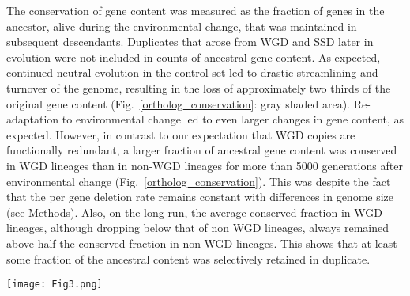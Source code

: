 The conservation of gene content was measured as the fraction of genes in the ancestor, alive during the environmental change, that was maintained in subsequent descendants. Duplicates that arose from  WGD and SSD later in evolution were not included in counts of ancestral gene content. As expected, continued neutral evolution in the control set led to drastic streamlining and turnover of the genome, resulting in the loss of approximately two thirds of the original gene content (Fig.~\ref{ortholog_conservation}: gray shaded area). Re-adaptation to environmental change led to even larger changes in gene content, as expected. However, in contrast to our expectation that WGD copies are functionally redundant, a larger fraction of ancestral gene content was conserved in WGD lineages than in non-WGD lineages for more than 5000 generations after environmental change (Fig.~\ref{ortholog_conservation}). This was despite the fact that the per gene deletion rate remains constant with differences in genome size (see Methods). Also, on the long run, the average conserved fraction in WGD lineages, although dropping below that of non WGD lineages, always remained above half the conserved fraction in non-WGD lineages. This shows that at least some fraction of the ancestral content was selectively retained in duplicate.

\begin{figure*}
\begin{center}
\texttt{[image: Fig3.png]}
\end{center}
\caption{\textbf{Fraction of conserved ancestral gene content through evolutionary time.} The gene content of ancestors at the time of environmental switch was used as reference. At 1000 generation intervals, the overlap in gene content of descendants with the reference was measured. All genes inherited one to one from the ancestral reference (not counting copies from subsequent duplication events) count towards the retained fraction of the total ancestral gene content, in WGD lineages (red), non-WGD lineages (blue) and a neutral control set where the environment was kept the same (gray). Boxes and whiskers show the 50\% (box) and 75\% (whiskers) ranges of the data around the median (line). Triangles and the upper edge of the shaded area show the averages of the environmental change and neutral evolutionary runs, respectively. The inset shows the distribution of genome sizes.}
\label{ortholog_conservation}
\end{figure*}

